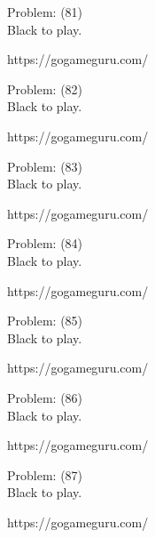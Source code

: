 \documentclass[11pt]{article}
\begin{document}
\begin{minipage}[t]{0.5\textwidth}
  {\centering
  
  Problem: (81)\\
  Black to play.

https://gogameguru.com/\\
  }
\end{minipage}
\begin{minipage}[t]{0.5\textwidth}
  {\centering
  
  Problem: (82)\\
  Black to play.

https://gogameguru.com/\\
  }
\end{minipage}
\begin{minipage}[t]{0.5\textwidth}
  {\centering
  
  Problem: (83)\\
  Black to play.

https://gogameguru.com/\\
  }
\end{minipage}
\begin{minipage}[t]{0.5\textwidth}
  {\centering
  
  Problem: (84)\\
  Black to play.

https://gogameguru.com/\\
  }
\end{minipage}
\begin{minipage}[t]{0.5\textwidth}
  {\centering
  
  Problem: (85)\\
  Black to play.

https://gogameguru.com/\\
  }
\end{minipage}
\begin{minipage}[t]{0.5\textwidth}
  {\centering
  
  Problem: (86)\\
  Black to play.

https://gogameguru.com/\\
  }
\end{minipage}
\begin{minipage}[t]{0.5\textwidth}
  {\centering
  
  Problem: (87)\\
  Black to play.

https://gogameguru.com/\\
  }
\end{minipage}
\end{document}
